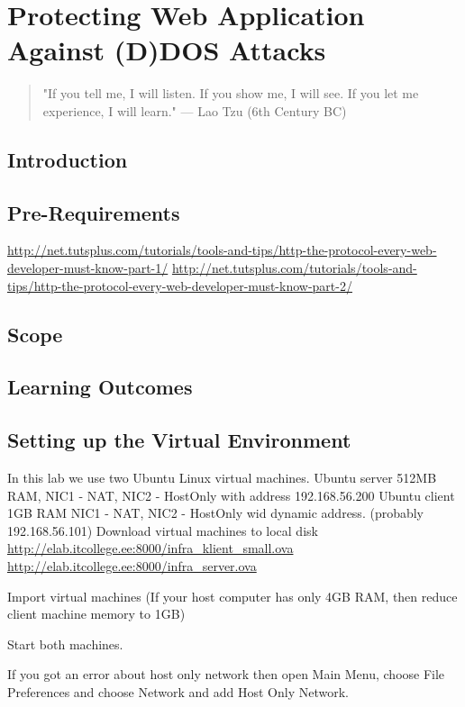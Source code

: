 

\chapter{Protecting Web Application Against (D)DOS Attacks}
\label{Protecting Web Application Against (D)DOS Attacks}

 
\begin{quote}
"If you tell me, I will listen. If you show me, I
will see. If you let me experience, I will learn." --- Lao Tzu (6th Century BC)
\end{quote}

\section{Introduction}
\section{Pre-Requirements}
\url{http://net.tutsplus.com/tutorials/tools-and-tips/http-the-protocol-every-web-developer-must-know-part-1/}
\url{http://net.tutsplus.com/tutorials/tools-and-tips/http-the-protocol-every-web-developer-must-know-part-2/}
\section{Scope}
\section{Learning Outcomes} 
\section{Setting up the Virtual Environment} 

In this lab we use two Ubuntu Linux virtual machines.
Ubuntu server 512MB RAM, NIC1 - NAT, NIC2 - HostOnly with address 192.168.56.200
Ubuntu client 1GB RAM NIC1 - NAT, NIC2 - HostOnly wid dynamic address. (probably 192.168.56.101)
Download virtual machines to local disk
\url{http://elab.itcollege.ee:8000/infra_klient_small.ova}
\url{http://elab.itcollege.ee:8000/infra_server.ova}

Import virtual machines (If your host computer has only 4GB RAM, then reduce client machine memory to 1GB)

Start both machines. 

{\small{If you got an error about host only network then open Main Menu, choose File Preferences and choose Network and add Host Only Network.}}

